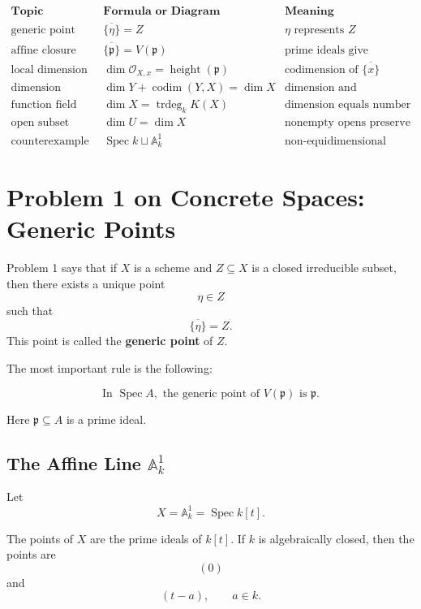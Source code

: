 \documentclass[12pt,a4paper]{article}
\theoremstyle{notespace}
\begin{document}
\[
\begin{array}{c|c|c}
	\textbf{Topic}
	&
	\textbf{Formula or Diagram}
	&
	\textbf{Meaning}
	\\
	\hline
	\text{generic point}
	&
	\overline{\{\eta\}}=Z
	&
	\eta\text{ represents }Z
	\\
	\text{affine closure}
	&
	\overline{\{\mathfrak p\}}=V(\mathfrak p)
	&
	\text{prime ideals give irreducible subsets}
	\\
	\text{local dimension}
	&
	\dim \mathcal O_{X,x}=\operatorname{height}(\mathfrak p)
	&
	\text{codimension of }\overline{\{x\}}
	\\
	\text{dimension formula}
	&
	\dim Y+\operatorname{codim}(Y,X)=\dim X
	&
	\text{dimension and codimension complement}
	\\
	\text{function field}
	&
	\dim X=\operatorname{trdeg}_k K(X)
	&
	\text{dimension equals number of parameters}
	\\
	\text{open subset}
	&
	\dim U=\dim X
	&
	\text{nonempty opens preserve dimension}
	\\
	\text{counterexample}
	&
	\operatorname{Spec} k\sqcup \mathbb A^1_k
	&
	\text{non-equidimensional schemes fail}
\end{array}
\]

\section{Problem 1 on Concrete Spaces: Generic Points}

Problem 1 says that if \(X\) is a scheme and \(Z\subseteq X\) is a closed irreducible subset, then there exists a unique point
\[
\eta\in Z
\]
such that
\[
\overline{\{\eta\}}=Z.
\]
This point is called the \textbf{generic point} of \(Z\).

The most important rule is the following:

\[
\boxed{
	\text{In } \operatorname{Spec} A,\text{ the generic point of }V(\mathfrak p)\text{ is }\mathfrak p.
}
\]

Here \(\mathfrak p\subseteq A\) is a prime ideal.

\subsection{The Affine Line \(\mathbb A^1_k\)}

Let
\[
X=\mathbb A^1_k=\operatorname{Spec} k[t].
\]

The points of \(X\) are the prime ideals of \(k[t]\). If \(k\) is algebraically closed, then the points are
\[
(0)
\]
and
\[
(t-a),\qquad a\in k.
\]
\end{document}
